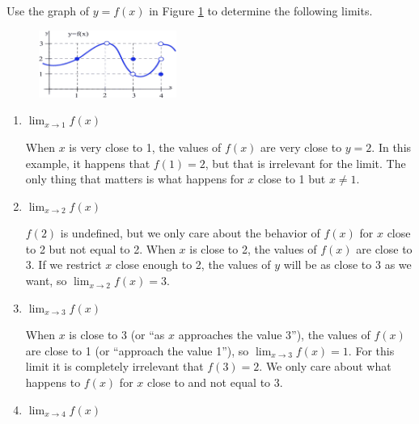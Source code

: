 \begin{example}
Use the graph of $y=f(x)$ in Figure \ref{fig:2-4-limit-ex} to determine the following limits.
\begin{figure}[!ht]
    \centering
    \includegraphics[width=0.4\textwidth]{img/chap2/image012.png}
    \label{$y=f(x)$}
    \label{fig:2-4-limit-ex}
\end{figure}

\begin{enumerate}[label=(\alph*)]
  \item $\displaystyle\lim_{x\to 1}f(x)$

  \begin{solution}
When $x$ is very close to 1, the values of $f(x)$ are very close to $y=2$. In this example, it happens that $f(1)=2$, but that is irrelevant for the limit. The only thing that matters is what happens for $x$ close to 1 but $x\neq 1$.
    \end{solution}
  \item $\displaystyle\lim_{x\to 2}f(x)$

  \begin{solution}
$f(2)$ is undefined, but we only care about the behavior of $f(x)$ for $x$ close to 2 but not equal to 2. When $x$ is close to 2, the values of $f(x)$ are close to 3. If we restrict $x$ close enough to 2, the values of $y$ will be as close to 3 as we want, so $\displaystyle\lim_{x\to 2}f(x)=3$.
    \end{solution}
  \item $\displaystyle\lim_{x\to 3}f(x)$

  \begin{solution}
When $x$ is close to 3 (or ``as $x$ approaches the value 3''), the values of $f(x)$ are close to 1 (or ``approach the value 1''), so $\displaystyle\lim_{x\to 3}f(x)=1$. For this limit it is completely irrelevant that $f(3)=2$. We only care about what happens to $f(x)$ for $x$ close to and not equal to 3.
    \end{solution}
  \item $\displaystyle\lim_{x\to 4}f(x)$


\end{enumerate}
\end{example}
